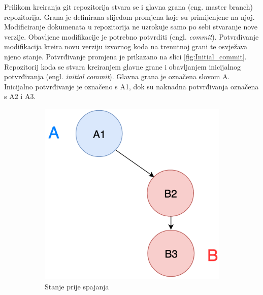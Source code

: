 \documentclass[times, utf8, diplomski, numeric]{fer}
\newcommand{\eng}[1]{(engl. \textit{#1})}
\begin{document}
\begin{appendices}
Prilikom kreiranja git repozitorija stvara se i glavna grana (eng. master branch) repozitorija. Grana je definirana slijedom promjena koje su primijenjene na njoj. Modificiranje dokumenata u repozitorija ne uzrokuje samo po sebi stvaranje nove verzije. Obavljene modifikacije je potrebno potvrditi \eng{commit}. Potvrđivanje modifikacija kreira novu verziju izvornog koda na trenutnoj grani te osvježava njeno stanje. Potvrđivanje promjena je prikazano na slici \ref{fig:Initial_commit}. Repozitorij koda se stvara kreiranjem glavne grane i obavljanjem inicijalnog potvrđivanja \eng{initial commit}. Glavna grana je označena slovom A. Inicijalno potvrđivanje je označeno s A1, dok su naknadna potvrđivanja označena s A2 i A3.

\begin{figure}
\centering
\begin{subfigure}{.49\textwidth}
\centering
\includegraphics[scale=0.6]{FastForwardA}
\caption{Stanje prije spajanja}
\label{fig:FastForwardA}
\end{subfigure}
\begin{subfigure}{.49\textwidth}
\centering

\end{subfigure}
\end{figure}
\end{appendices}
\end{document}
